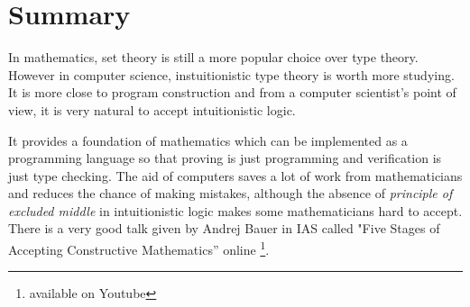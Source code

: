 




\section{Summary}


In mathematics, set theory is still a more popular choice over type theory. However in computer science, instuitionistic type theory is worth more studying. It is more close to program construction and from a computer scientist's point of view, it is very natural to accept intuitionistic logic. 

It provides a foundation of mathematics which can be implemented as a programming language so that proving is just programming and verification is just type checking. The aid of computers saves a lot of work from mathematicians and reduces the chance of making mistakes, although the absence of \emph{principle of excluded middle} in intuitionistic logic makes some mathematicians hard to accept. There is a very good talk given by Andrej Bauer in IAS called "Five Stages of Accepting Constructive Mathematics'' online \footnote{available on Youtube}.



